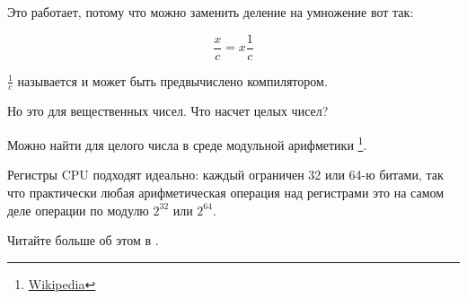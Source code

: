 Это работает, потому что можно заменить деление на умножение вот так:

\[
	\frac{x}{c} = x\frac{1}{c}
\]


$\frac{1}{c}$ называется  и может быть предвычислено компилятором.

Но это для вещественных чисел.
Что насчет целых чисел?

Можно найти  для целого числа в среде модульной арифметики
\footnote{\href{http://go.yurichev.com/17359}{Wikipedia}}.

Регистры \ac{CPU} подходят идеально: каждый ограничен 32 или 64-ю битами, так что практически любая арифметическая операция над регистрами это на самом деле операции по модулю $2^{32}$ или $2^{64}$.

Читайте больше об этом в .
